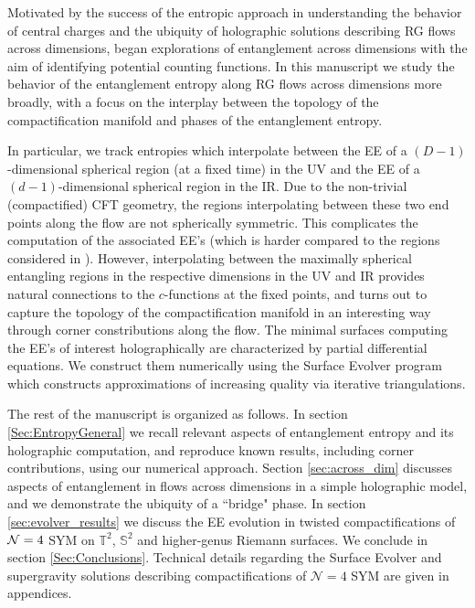 \documentclass[11 pt]{article}
\begin{document}
Motivated by the success of the entropic approach in understanding the behavior of central charges and the ubiquity of holographic solutions describing RG flows across dimensions, \cite{Bea:2015fja,GonzalezLezcano:2022mcd} began explorations  of entanglement across dimensions with the aim of identifying potential counting functions. In this manuscript we  study the behavior of the entanglement entropy along RG flows across dimensions more broadly, with a focus on the interplay between the topology of the compactification manifold and phases of the entanglement entropy. 

In particular, we track entropies which interpolate between the EE of a $(D-1)$-dimensional spherical region (at a fixed time) in the UV and the EE of a $(d-1)$-dimensional spherical region in the IR. Due to the non-trivial (compactified) CFT geometry, the regions interpolating between these two end points along the flow are not spherically symmetric.
This complicates the computation of the associated EE's (which is harder compared to the regions considered in \cite{Bea:2015fja,GonzalezLezcano:2022mcd}). However, interpolating between the maximally spherical entangling regions in the respective dimensions in the UV and IR provides natural connections to the $c$-functions at the fixed points, and turns out to capture the topology of the compactification manifold in an interesting way through corner constributions along the flow.
%
The minimal surfaces computing the EE's of interest holographically are characterized by partial differential equations. We construct them numerically using the Surface Evolver program \cite{Brakke,Brakke1992} which constructs approximations of increasing quality via iterative triangulations. 
    
The rest of the manuscript is organized as follows. In section \ref{Sec:EntropyGeneral} we recall relevant aspects of entanglement entropy and its holographic computation, and reproduce known results, including corner contributions, using our numerical approach. Section \ref{sec:across_dim} discusses aspects of entanglement in flows across dimensions in a simple holographic model, and we demonstrate the ubiquity of a ``bridge" phase. In section \ref{sec:evolver_results} we discuss the EE evolution in twisted compactifications of ${\cal N}=4$ SYM on $\mathbb{T}^2$, $\mathbb{S}^2$ and higher-genus Riemann surfaces. We conclude in section \ref{Sec:Conclusions}.  Technical details regarding the Surface Evolver and supergravity solutions describing compactifications of $\mathcal N=4$ SYM are given in appendices.
       
\end{document}

